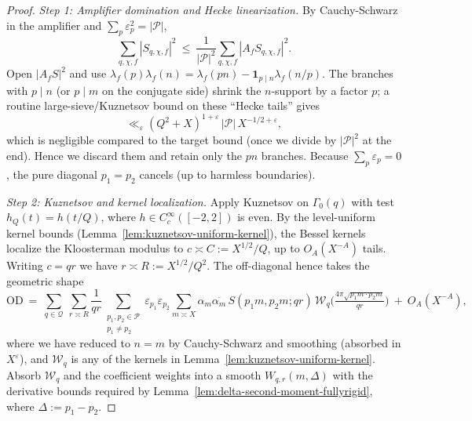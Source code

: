 \documentclass[11pt]{article}
\theoremstyle{definition}
\theoremstyle{remark}
\numberwithin{equation}{part}
\begin{document}
\begin{proof}
	\emph{Step 1: Amplifier domination and Hecke linearization.}
	By Cauchy-Schwarz in the amplifier and $\sum_p\varepsilon_p^2=|\mathcal P|$,
	\[
		\sum_{q,\chi,f} |S_{q,\chi,f}|^2 \ \le\ \frac{1}{|\mathcal P|^2}\sum_{q,\chi,f}|A_f S_{q,\chi,f}|^2.
	\]
	Open $|A_f S|^2$ and use $\lambda_f(p)\lambda_f(n)=\lambda_f(pn)-\mathbf 1_{p\mid n}\lambda_f(n/p)$.
	The branches with $p\mid n$ (or $p\mid m$ on the conjugate side) shrink the $n$-support by a factor $p$; a routine large-sieve/Kuznetsov bound on these “Hecke tails” gives
	\[
		\ll_\varepsilon (Q^2+X)^{1+\varepsilon}\,|\mathcal P|\,X^{-1/2+\varepsilon},
	\]
	which is negligible compared to the target bound (once we divide by $|\mathcal P|^2$ at the end). Hence we discard them and retain only the $pn$ branches. Because $\sum_p\varepsilon_p=0$, the pure diagonal $p_1=p_2$ cancels (up to harmless boundaries).

	\emph{Step 2: Kuznetsov and kernel localization.}
	Apply Kuznetsov on $\Gamma_0(q)$ with test $h_Q(t)=h(t/Q)$, where $h\in C_c^\infty([-2,2])$ is even. By the level-uniform kernel bounds (Lemma~\ref{lem:kuznetsov-uniform-kernel}), the Bessel kernels localize the Kloosterman modulus to $c\asymp C:=X^{1/2}/Q$, up to $O_A(X^{-A})$ tails. Writing $c=qr$ we have $r\asymp R:=X^{1/2}/Q^2$. The off-diagonal hence takes the geometric shape
	\[
		\mathrm{OD}\ =\ \sum_{q\in\mathcal Q}\ \sum_{r\asymp R}\frac{1}{qr}
		\sum_{\substack{p_1,p_2\in\mathcal P\\ p_1\ne p_2}}\varepsilon_{p_1}\varepsilon_{p_2}
		\sum_{m\asymp X}\alpha_m\overline{\alpha_m}\,
		S(p_1 m, p_2 m; qr)\,
		\mathcal W_q\!\Big(\tfrac{4\pi\sqrt{p_1 m\cdot p_2 m}}{qr}\Big)
		\ +\ O_A(X^{-A}),
	\]
	where we have reduced to $n=m$ by Cauchy-Schwarz and smoothing (absorbed in $X^\varepsilon$), and $\mathcal W_q$ is any of the kernels in Lemma~\ref{lem:kuznetsov-uniform-kernel}. Absorb $\mathcal W_q$ and the coefficient weights into a smooth $W_{q,r}(m,\Delta)$ with the derivative bounds required by Lemma~\ref{lem:delta-second-moment-fullyrigid}, where $\Delta:=p_1-p_2$.


\end{proof}
\end{document}
